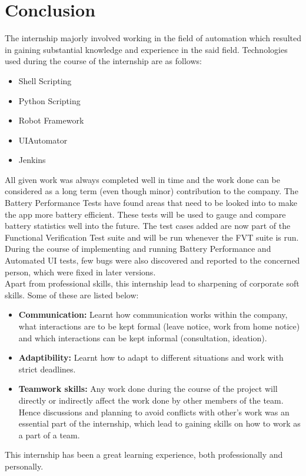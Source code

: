 \setlength\parindent{0pt}

\chapter{Conclusion}

The internship majorly involved working in the field of automation which resulted in gaining substantial knowledge and experience in the said field. Technologies used during the course of the internship are as follows:
\begin{itemize}
	\item Shell Scripting
	\item Python Scripting
	\item Robot Framework
	\item UIAutomator
	\item Jenkins
\end{itemize}

All given work was always completed well in time and the work done can be considered as a long term (even though minor) contribution to the company. The Battery Performance Tests have found areas that need to be looked into to make the app more battery efficient. These tests will be used to gauge and compare battery statistics well into the future. The test cases added are now part of the Functional Verification Test suite and will be run whenever the FVT suite is run. During the course of implementing and running Battery Performance and Automated UI tests, few bugs were also discovered and reported to the concerned person, which were fixed in later versions. \\

Apart from professional skills, this internship lead to sharpening of corporate soft skills. Some of these are listed below:
\begin{itemize} 
	\item\textbf{Communication:} Learnt how communication works within the company, what interactions are to be kept formal (leave notice, work from home notice) and which interactions can be kept informal (consultation, ideation).
	\item\textbf{Adaptibility:} Learnt how to adapt to different situations and work with strict deadlines. 
	\item\textbf{Teamwork skills:} Any work done during the course of the project will directly or indirectly affect the work done by other members of the team. Hence discussions and planning to avoid conflicts with other's work was an essential part of the internship, which lead to gaining skills on how to work as a part of a team.
\end{itemize}

This internship has been a great learning experience, both professionally and personally.